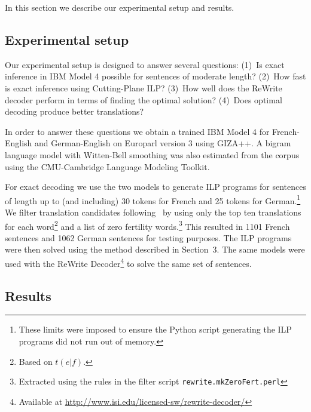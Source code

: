 \vspace{-1ex}
In this section we describe our experimental setup and results.
\vspace{-1ex}
\subsection{Experimental setup}
\label{sec:experimental-setup}

Our experimental setup is designed to answer several questions: (1)~Is
exact inference in IBM Model 4 possible for sentences of moderate
length? (2)~How fast is exact inference using Cutting-Plane ILP?
(3)~How well does the ReWrite decoder perform in terms of finding the
optimal solution? (4)~Does optimal decoding produce better
translations?

In order to answer these questions we obtain a trained IBM Model 4 for
French-English and German-English on Europarl version 3 using GIZA++.
A bigram language model with Witten-Bell smoothing was also estimated
from the corpus using the CMU-Cambridge Language Modeling Toolkit.

For exact decoding we use the two models to generate ILP programs for
sentences of length up to (and including) 30 tokens for French and 25
tokens for German.\footnote{These limits were imposed to ensure the
  Python script generating the ILP programs did not run out of
  memory.}  We filter translation candidates
following~\cite{GermannFast04} by using only the top ten translations
for each word\footnote{Based on $t(e|f)$.} and a list of zero
fertility words.\footnote{Extracted using the rules in the filter
  script \texttt{rewrite.mkZeroFert.perl}} This resulted in 1101
French sentences and 1062 German sentences for testing purposes.  The
ILP programs were then solved using the method described in Section~3.
The same models were used with the ReWrite Decoder\footnote{Available
  at \url{http://www.isi.edu/licensed-sw/rewrite-decoder/}} to solve
the same set of sentences.


\subsection{Results}
\label{sec:results-results}

